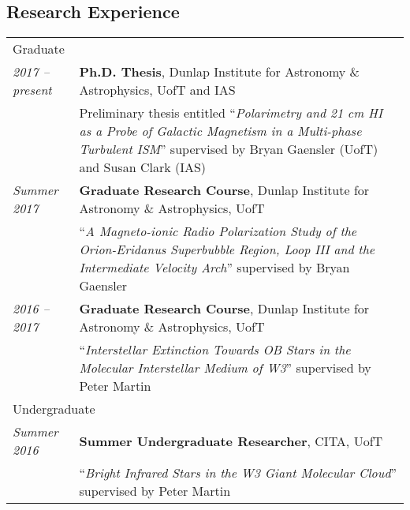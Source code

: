 \documentclass[10pt]{res} %
\begin{document}
\begin{resume}
\section{\Large Research Experience}
\vspace{-5pt} %
\noindent\makebox[\linewidth]{\rule{\textwidth}{0.4pt}}
\vspace{-20pt} %

\begin{table}[h]
\begin{tabularx}{\textwidth}{ @{} p{6.5em} X @{} }
\multicolumn{2}{l}{ \rule{0pt}{3ex} \large \hspace{-12pt} Graduate \dotfill \rule[-1.2ex]{0pt}{0pt}} \\
\textit{2017 -- present} & \textbf{Ph.D. Thesis}, Dunlap Institute for Astronomy \& Astrophysics, UofT and IAS \\
                                    & Preliminary thesis entitled ``\textit{Polarimetry and 21 cm HI as a Probe of Galactic Magnetism in a Multi-phase Turbulent ISM}'' supervised by Bryan Gaensler (UofT) and Susan Clark (IAS) \\
\textit{Summer 2017} & \textbf{Graduate Research Course}, Dunlap Institute for Astronomy \& Astrophysics, UofT \\
                                   & ``\textit{A Magneto-ionic Radio Polarization Study of the Orion-Eridanus Superbubble Region, Loop III and the Intermediate Velocity Arch}'' supervised by Bryan Gaensler \\
\textit{2016 -- 2017} & \textbf{Graduate Research Course}, Dunlap Institute for Astronomy \& Astrophysics, UofT  \\
                                 & ``\textit{Interstellar Extinction Towards OB Stars in the Molecular Interstellar Medium of W3}'' supervised by Peter Martin \\
\multicolumn{2}{l}{ \rule{0pt}{6.5ex} \large \hspace{-12pt} Undergraduate \dotfill \rule[-1.2ex]{0pt}{0pt}} \\
\textit{Summer 2016} & \textbf{Summer Undergraduate Researcher}, CITA, UofT \\
                                  & ``\textit{Bright Infrared Stars in the W3 Giant Molecular Cloud}'' supervised by Peter Martin \\

\end{tabularx}
\end{table}
\end{resume}
\end{document}
